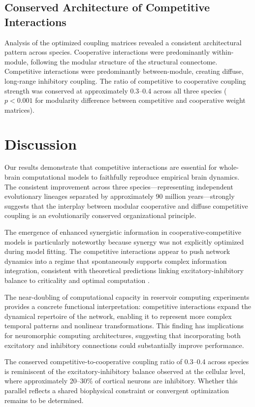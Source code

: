 \documentclass[11pt]{article}
\begin{document}
\subsection{Conserved Architecture of Competitive Interactions}

Analysis of the optimized coupling matrices revealed a consistent architectural pattern across species. Cooperative interactions were predominantly within-module, following the modular structure of the structural connectome. Competitive interactions were predominantly between-module, creating diffuse, long-range inhibitory coupling. The ratio of competitive to cooperative coupling strength was conserved at approximately 0.3--0.4 across all three species ($p < 0.001$ for modularity difference between competitive and cooperative weight matrices).

\section{Discussion}

Our results demonstrate that competitive interactions are essential for whole-brain computational models to faithfully reproduce empirical brain dynamics. The consistent improvement across three species---representing independent evolutionary lineages separated by approximately 90 million years---strongly suggests that the interplay between modular cooperative and diffuse competitive coupling is an evolutionarily conserved organizational principle.

The emergence of enhanced synergistic information in cooperative-competitive models is particularly noteworthy because synergy was not explicitly optimized during model fitting. The competitive interactions appear to push network dynamics into a regime that spontaneously supports complex information integration, consistent with theoretical predictions linking excitatory-inhibitory balance to criticality and optimal computation \citep{shew2013functional}.

The near-doubling of computational capacity in reservoir computing experiments provides a concrete functional interpretation: competitive interactions expand the dynamical repertoire of the network, enabling it to represent more complex temporal patterns and nonlinear transformations. This finding has implications for neuromorphic computing architectures, suggesting that incorporating both excitatory and inhibitory connections could substantially improve performance.

The conserved competitive-to-cooperative coupling ratio of 0.3--0.4 across species is reminiscent of the excitatory-inhibitory balance observed at the cellular level, where approximately 20--30\% of cortical neurons are inhibitory. Whether this parallel reflects a shared biophysical constraint or convergent optimization remains to be determined.
\end{document}
